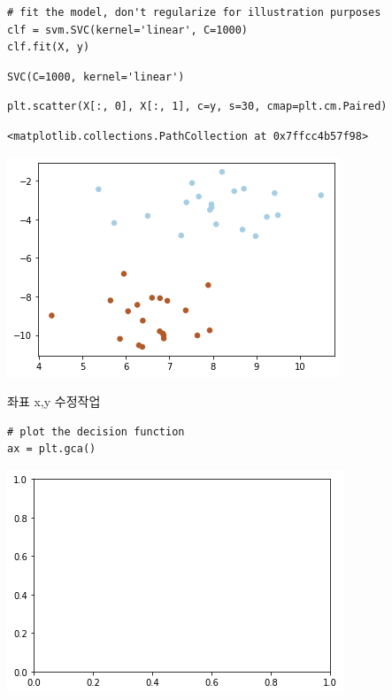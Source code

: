 \documentclass[11pt]{article}
\begin{document}
\begin{verbatim}
# fit the model, don't regularize for illustration purposes
clf = svm.SVC(kernel='linear', C=1000)
clf.fit(X, y)
\end{verbatim}

\begin{verbatim}
SVC(C=1000, kernel='linear')
\end{verbatim}

\begin{verbatim}
plt.scatter(X[:, 0], X[:, 1], c=y, s=30, cmap=plt.cm.Paired)
\end{verbatim}

\begin{verbatim}
<matplotlib.collections.PathCollection at 0x7ffcc4b57f98>
\end{verbatim}

\begin{center}
\includegraphics[width=.9\linewidth]{./obipy-resources/dPNazO.png}
\end{center}

좌표 x,y 수정작업
\begin{verbatim}
# plot the decision function
ax = plt.gca()
\end{verbatim}

\begin{center}
\includegraphics[width=.9\linewidth]{./obipy-resources/zNktqY.png}
\end{center}
\end{document}
